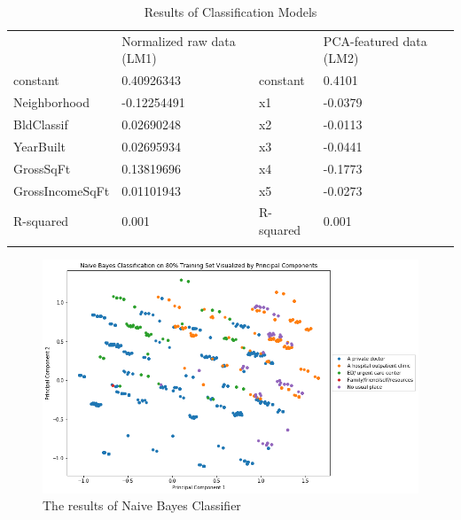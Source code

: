 \documentclass[10pt,twocolumn]{article}
\begin{document}
\begin{center}
\begin{table}[]
\centering
\caption{Results of Classification Models}
\label{my-label}
\begin{tabular}{lllll}
                & Normalized raw data (LM1) &          & PCA-featured data (LM2) & \\
constant        & 0.40926343                & constant & 0.4101                  & \\
Neighborhood    & -0.12254491               & x1       & -0.0379                 & \\
BldClassif      & 0.02690248                & x2       & -0.0113                 & \\
YearBuilt       & 0.02695934                & x3       & -0.0441                 & \\
GrossSqFt       & 0.13819696                & x4       & -0.1773                 & \\
GrossIncomeSqFt & 0.01101943                & x5       & -0.0273                 & \\
R-squared       & 0.001                     & R-squared& 0.001                   & \\
                &                           &          &                         &
\end{tabular}
\end{table}
\end{center}

\begin{figure}[!t]
  \begin{center}
    \includegraphics[width=6in]{PCA_NaiveBayes.png}
  \end{center}

  \caption{\small The results of Naive Bayes Classifier}
  \label{fig-1}
\end{figure}
\end{document}
